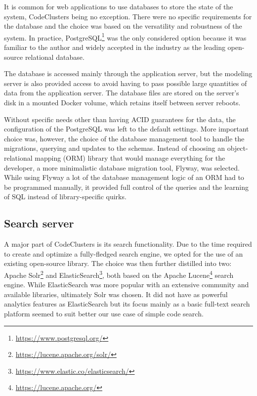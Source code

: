 It is common for web applications to use databases to store the state of the system, CodeClusters being no exception. There were no specific requirements for the database and the choice was based on the versatility and robustness of the system. In practice, PostgreSQL\footnote{\url{https://www.postgresql.org/}} was the only considered option because it was familiar to the author and widely accepted in the industry as the leading open-source relational database.

The database is accessed mainly through the application server, but the modeling server is also provided access to avoid having to pass possible large quantities of data from the application server. The database files are stored on the server's disk in a mounted Docker volume, which retains itself between server reboots.

Without specific needs other than having ACID guarantees for the data, the configuration of the PostgreSQL was left to the default settings. More important choice was, however, the choice of the database management tool to handle the migrations, querying and updates to the schemas. Instead of choosing an object-relational mapping (ORM) library that would manage everything for the developer, a more minimalistic database migration tool, Flyway, was selected. While using Flyway a lot of the database management logic of an ORM had to be programmed manually, it provided full control of the queries and the learning of SQL instead of library-specific quirks.

\subsection{Search server}

A major part of CodeClusters is its search functionality. Due to the time required to create and optimize a fully-fledged search engine, we opted for the use of an existing open-source library. The choice was then further distilled into two: Apache Solr\footnote{\url{https://lucene.apache.org/solr/}} and ElasticSearch\footnote{\url{https://www.elastic.co/elasticsearch/}}, both based on the Apache Lucene\footnote{\url{https://lucene.apache.org/}} search engine. While ElasticSearch was more popular with an extensive community and available libraries, ultimately Solr was chosen. It did not have as powerful analytics features as ElasticSearch but its focus mainly as a basic full-text search platform seemed to suit better our use case of simple code search.


